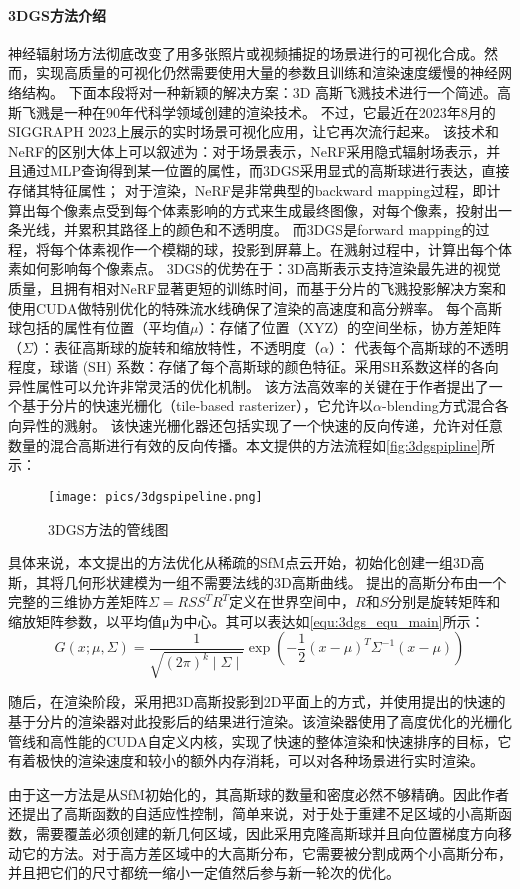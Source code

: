 \paragraph{3DGS方法介绍}
神经辐射场方法彻底改变了用多张照片或视频捕捉的场景进行的可视化合成。然而，实现高质量的可视化仍然需要使用大量的参数且训练和渲染速度缓慢的神经网络结构。
下面本段将对一种新颖的解决方案：3D 高斯飞溅技术进行一个简述。高斯飞溅是一种在90年代科学领域创建的渲染技术。
不过，它最近在2023年8月的 SIGGRAPH 2023上展示的实时场景可视化应用，让它再次流行起来。
该技术和NeRF的区别大体上可以叙述为：对于场景表示，NeRF采用隐式辐射场表示，并且通过MLP查询得到某一位置的属性，而3DGS采用显式的高斯球进行表达，直接存储其特征属性；
对于渲染，NeRF是非常典型的backward mapping过程，即计算出每个像素点受到每个体素影响的方式来生成最终图像，对每个像素，投射出一条光线，并累积其路径上的颜色和不透明度。
而3DGS是forward mapping的过程，将每个体素视作一个模糊的球，投影到屏幕上。在溅射过程中，计算出每个体素如何影响每个像素点。
3DGS的优势在于：3D高斯表示支持渲染最先进的视觉质量，且拥有相对NeRF显著更短的训练时间，而基于分片的飞溅投影解决方案和使用CUDA做特别优化的特殊流水线确保了渲染的高速度和高分辨率。
每个高斯球包括的属性有位置（平均值$\mu$）：存储了位置（XYZ）的空间坐标，协方差矩阵（$\Sigma$）：表征高斯球的旋转和缩放特性，不透明度（$\alpha$）：
代表每个高斯球的不透明程度，球谐 (SH) 系数：存储了每个高斯球的颜色特征。采用SH系数这样的各向异性属性可以允许非常灵活的优化机制。
该方法高效率的关键在于作者提出了一个基于分片的快速光栅化（tile-based rasterizer），它允许以$\alpha$-blending方式混合各向异性的溅射。
该快速光栅化器还包括实现了一个快速的反向传递，允许对任意数量的混合高斯进行有效的反向传播。本文提供的方法流程如\autoref{fig:3dgspipline}所示：

\begin{figure}[htbp]
    \centering
    \texttt{[image: pics/3dgspipeline.png]}
    \caption{\label{fig:3dgspipline}3DGS方法的管线图}
\end{figure}

具体来说，本文提出的方法优化从稀疏的SfM点云开始，初始化创建一组3D高斯，其将几何形状建模为一组不需要法线的3D高斯曲线。
提出的高斯分布由一个完整的三维协方差矩阵\(\Sigma=RSS^TR^T\)定义在世界空间中，$R$和$S$分别是旋转矩阵和缩放矩阵参数，以平均值μ为中心。其可以表达如\autoref{equ:3dgs_equ_main}所示：
\begin{equation}
    \label{equ:3dgs_equ_main}
    G\left(x;\mu,\Sigma\right)=\frac1{\sqrt{(2\pi)^k\mid\Sigma\mid}}\exp\left(-\frac12(x-\mu)^T\Sigma^{-1}(x-\mu)\right)
\end{equation}
\par 随后，在渲染阶段，采用把3D高斯投影到2D平面上的方式，并使用提出的快速的基于分片的渲染器对此投影后的结果进行渲染。该渲染器使用了高度优化的光栅化管线和高性能的CUDA自定义内核，实现了快速的整体渲染和快速排序的目标，它有着极快的渲染速度和较小的额外内存消耗，可以对各种场景进行实时渲染。
\par 由于这一方法是从SfM初始化的，其高斯球的数量和密度必然不够精确。因此作者还提出了高斯函数的自适应性控制，简单来说，对于处于重建不足区域的小高斯函数，需要覆盖必须创建的新几何区域，因此采用克隆高斯球并且向位置梯度方向移动它的方法。对于高方差区域中的大高斯分布，它需要被分割成两个小高斯分布，并且把它们的尺寸都统一缩小一定值然后参与新一轮次的优化。
